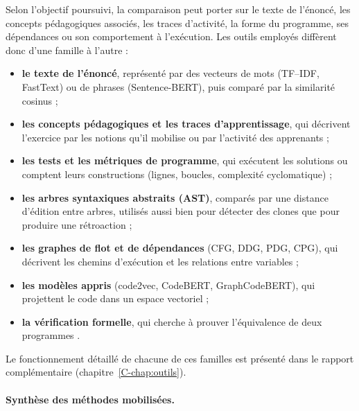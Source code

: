 \documentclass[12pt,a4paper,oneside]{report}
\begin{document}
Selon l'objectif poursuivi, la comparaison peut porter sur le texte de
l'énoncé, les concepts pédagogiques associés, les traces d'activité, la forme
du programme, ses dépendances ou son comportement à l'exécution. Les outils
employés diffèrent donc d'une famille à l'autre :
\begin{itemize}
  \item \textbf{le texte de l'énoncé}, représenté par des vecteurs de mots
        (TF--IDF, FastText) ou de phrases (Sentence-BERT), puis comparé par
        la similarité cosinus \cite{tian_2022,reimers_sentence-bert_2019} ;
  \item \textbf{les concepts pédagogiques et les traces d'apprentissage},
        qui décrivent l'exercice par les notions qu'il mobilise ou par
        l'activité des apprenants \cite{hosseini_2017,liu_2018} ;
  \item \textbf{les tests et les métriques de programme}, qui exécutent les
        solutions ou comptent leurs constructions (lignes, boucles,
        complexité cyclomatique) \cite{messer_2024} ;
  \item \textbf{les arbres syntaxiques abstraits (AST)}, comparés par une
        distance d'édition entre arbres, utilisés aussi bien pour détecter
        des clones que pour produire une rétroaction
        \cite{baxter_clone_1998,zhang_simple_1989,song_revisiting_2024,jolivet_modelisation_2025} ;
  \item \textbf{les graphes de flot et de dépendances} (CFG, DDG, PDG, CPG),
        qui décrivent les chemins d'exécution et les relations entre
        variables \cite{vujosevic-janicic_software_2013,xiang_graph_2024,paiva_comparing_2024} ;
  \item \textbf{les modèles appris} (code2vec, CodeBERT, GraphCodeBERT),
        qui projettent le code dans un espace vectoriel
        \cite{alon_2019,feng_2020,guo_2021} ;
  \item \textbf{la vérification formelle}, qui cherche à prouver
        l'équivalence de deux programmes
        \cite{milovancevic_automated_nodate,vafeiadis_formal_2025}.
\end{itemize}
Le fonctionnement détaillé de chacune de ces familles est présenté dans le
rapport complémentaire (chapitre~\ref{C-chap:outils}).

\paragraph{Synthèse des méthodes mobilisées.}
\end{document}
